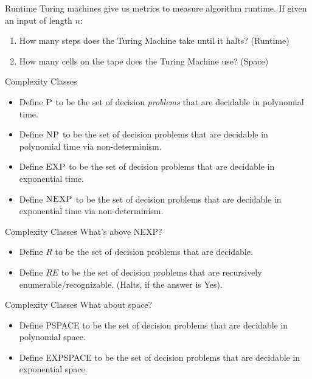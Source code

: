 \documentclass[aspectratio=169, handout]{beamer}
\begin{document}
\begin{frame}{Runtime}
    Turing machines give us metrics to measure algorithm runtime. If given an input of length $n$: \pause
    \begin{enumerate}
        \item How many steps does the Turing Machine take until it halts? (Runtime) \pause
        \item How many cells on the tape does the Turing Machine use? (Space)
    \end{enumerate}
\end{frame}

\begin{frame}{Complexity Classes}
    \begin{itemize}
        \item Define $\textsc{P}$ to be the set of decision \textit{problems} that are decidable in polynomial time. \pause
        \item Define $\textsc{NP}$ to be the set of decision problems that are decidable in polynomial time via non-determinism. \pause
        \item Define $\textsc{EXP}$ to be the set of decision problems that are decidable in exponential time. \pause
        \item Define $\textsc{NEXP}$ to be the set of decision problems that are decidable in exponential time via non-determinism.
    \end{itemize}
\end{frame}

\begin{frame}{Complexity Classes}
    What's above \textsc{NEXP}? \pause
    \begin{itemize}
        \item Define $R$ to be the set of decision problems that are decidable. \pause
        \item Define $RE$ to be the set of decision problems that are recursively  enumerable/recognizable. (Halts, if the answer is Yes).
    \end{itemize}
\end{frame}

\begin{frame}{Complexity Classes}
    What about space? \pause
    \begin{itemize}
        \item Define \textsc{PSPACE} to be the set of decision problems that are decidable in polynomial space. \pause
        \item Define \textsc{EXPSPACE} to be the set of decision problems that are decidable in exponential space.
    \end{itemize}
\end{frame}
\end{document}
